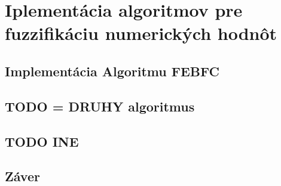 \chapter{Iplementácia algoritmov pre fuzzifikáciu numerických hodnôt} 

\section{Implementácia Algoritmu FEBFC}



\section{TODO = DRUHY algoritmus}

\section{TODO INE }

\section{Záver}